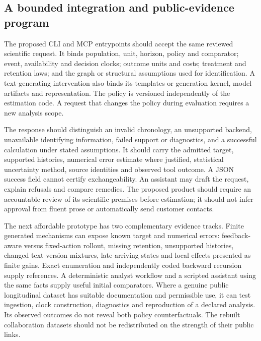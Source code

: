 \subsection{A bounded integration and public-evidence program}

The proposed CLI and MCP entrypoints should accept the same reviewed
scientific request. It binds population, unit, horizon, policy and
comparator; event, availability and decision clocks; outcome units and
costs; treatment and retention laws; and the graph or structural
assumptions used for identification. A text-generating intervention also
binds its templates or generation kernel, model artifacts and
representation. The policy is versioned independently of the
estimation code. A request that changes the policy during evaluation
requires a new analysis scope.

The response should distinguish an invalid chronology, an unsupported
backend, unavailable identifying information, failed support or
diagnostics, and a successful calculation under stated assumptions.
It should carry the admitted target, supported histories, numerical
error estimate where justified, statistical uncertainty method, source
identities and observed tool outcome. A JSON success field cannot
certify exchangeability.
An assistant may draft the request, explain refusals and compare remedies.
The proposed product should require an accountable review of its
scientific premises before estimation; it should not infer approval
from fluent prose or automatically send customer contacts.

The next affordable prototype has two complementary evidence tracks.
Finite generated mechanisms can expose known target and numerical
errors: feedback-aware versus fixed-action rollout, missing retention,
unsupported histories, changed text-version mixtures, late-arriving
states and local effects presented as finite gains. Exact enumeration
and independently coded backward recursion supply references. A
deterministic analyst workflow and a scripted assistant using the same
facts supply useful initial comparators. Where a genuine public
longitudinal dataset has suitable documentation and permissible use, it
can test ingestion, clock construction, diagnostics and reproduction
of a declared analysis. Its observed outcomes do not reveal both policy
counterfactuals. The rebuilt collaboration datasets should not be
redistributed on the strength of their public links.

